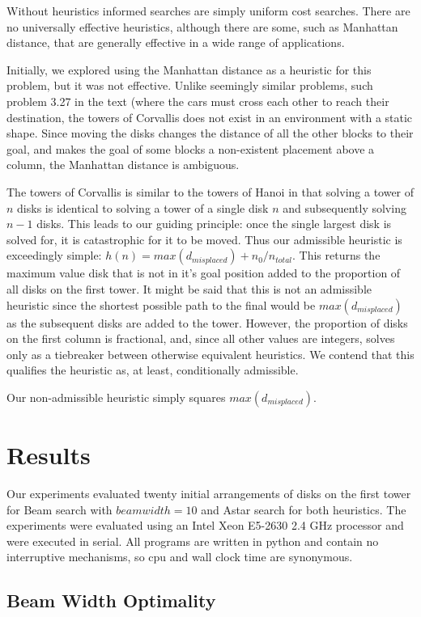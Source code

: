 \documentclass[12pt]{article}
\begin{document}
Without heuristics informed searches are simply uniform cost searches.
There are no universally effective heuristics, although there are some, such as Manhattan distance, that are generally effective in a wide range of applications.

Initially, we explored using the Manhattan distance as a heuristic for this problem, but it was not effective.
Unlike seemingly similar problems, such problem 3.27 in the text (where the cars must cross each other to reach their destination, the towers of Corvallis does not exist in an environment with a static shape.
Since moving the disks changes the distance of all the other blocks to their goal, and makes the goal of some blocks a non-existent placement above a column, the Manhattan distance is ambiguous.

The towers of Corvallis is similar to the towers of Hanoi in that solving a tower of $n$ disks is identical to solving a tower of a single disk $n$ and subsequently solving $n-1$ disks.
This leads to our guiding principle: once the single largest disk is solved for, it is catastrophic for it to be moved.
Thus our admissible heuristic is exceedingly simple: $h(n) = max(d_{misplaced}) + n_0/n_{total}$.
This returns the maximum value disk that is not in it's goal position added to the proportion of all disks on the first tower.
It might be said that this is not an admissible heuristic since the shortest possible path to the final would be $max(d_{misplaced})$ as the subsequent disks are added to the tower.
However, the proportion of disks on the first column is fractional, and, since all other values are integers, solves only as a tiebreaker between otherwise equivalent heuristics.
We contend that this qualifies the heuristic as, at least, conditionally admissible.

Our non-admissible heuristic simply squares $max(d_{misplaced})$.

\section{Results}

Our experiments evaluated twenty initial arrangements of disks on the first tower for Beam search with $beam width=10$ and Astar search for both heuristics.
The experiments were evaluated using an Intel Xeon E5-2630 2.4 GHz processor and were executed in serial.
All programs are written in python and contain no interruptive mechanisms, so cpu and wall clock time are synonymous.

\subsection{Beam Width Optimality}
\end{document}

